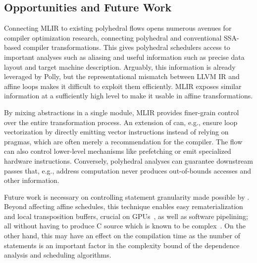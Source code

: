 \subsection{Opportunities and Future Work}\label{sec:opportunites}
Connecting MLIR to existing polyhedral flows opens numerous avenues for compiler optimization research, connecting polyhedral and conventional SSA-based compiler transformations.
This gives polyhedral schedulers access to important analyses such as aliasing and useful information such as precise data layout and target machine description.
Arguably, this information is already leveraged by Polly, but the representational mismatch between LLVM IR and affine loops makes it difficult to exploit them efficiently.
MLIR exposes similar information at a sufficiently high level to make it usable in affine transformations.

By mixing abstractions in a single module, MLIR provides finer-grain control over the entire transformation process.
An extension of \tool can, e.g., ensure loop vectorization by directly emitting vector instructions instead of relying on pragmas, which are often merely a recommendation for the compiler. The flow can also control lower-level mechanisms like prefetching or emit specialized hardware instructions.
Conversely, polyhedral analyses can guarantee downstream passes that, e.g., address computation never produces out-of-bounds accesses and other information.


Future work is necessary on controlling statement granularity made possible by \tool. Beyond affecting affine schedules, this technique enables easy rematerialization and local transposition buffers, crucial on GPUs~\cite{gpu_transpose}, as well as software pipelining; all without having to produce C source which is known to be complex~\cite{csmith}. On the other hand, this may have an effect on the compilation time as the number of statements is an important factor in the complexity bound of the dependence analysis and scheduling algorithms.

